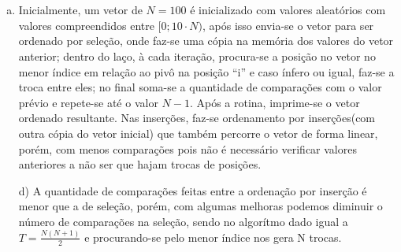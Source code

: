 \documentclass{article}
\begin{document}
\section{}
	\begin{enumerate}[a)]
		\item Inicialmente, um vetor de $N = 100$ é inicializado com valores aleatórios com valores compreendidos entre $[0; 10 \cdot N)$, após isso envia-se o vetor para ser ordenado por seleção, onde faz-se uma cópia na memória dos valores do vetor anterior; dentro do laço, à cada iteração, procura-se a posição no vetor no menor índice em relação ao pivô na posição ``i'' e caso ínfero ou igual, faz-se a troca entre eles; no final soma-se a quantidade de comparações com o valor prévio e repete-se até o valor $N - 1$. Após a rotina, imprime-se o vetor ordenado resultante.
		Nas inserções, faz-se ordenamento por inserções(com outra cópia do vetor inicial) que também percorre o vetor de forma linear, porém, com menos comparações pois não é necessário verificar valores anteriores a não ser que hajam trocas de posições.
	\item[d)] A quantidade de comparações feitas entre a ordenação por inserção é menor que a de seleção, porém, com algumas melhoras podemos diminuir o número de comparações na seleção, sendo no algorítmo dado igual a $T = \frac{N(N+1)}{2}$ e procurando-se pelo menor índice nos gera N trocas.
	\end{enumerate}
\end{document}
